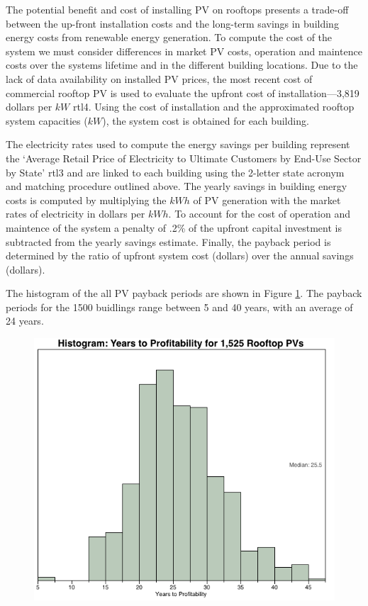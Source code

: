 The potential benefit and cost of installing PV on rooftops presents a trade-off between the up-front installation costs and the long-term savings in building energy costs from renewable energy generation. To compute the cost of the system we must consider differences in market PV costs, operation and maintence costs over the systems lifetime and in the different building locations. Due to the lack of data availability on installed PV prices, the most recent cost of commercial rooftop PV is used to evaluate the upfront cost of installation---3,819 dollars per $kW$ \cite{roisin}{rtl4}. Using the cost of installation and the approximated rooftop system capacities ($kW$), the system cost is obtained for each building. 
\par
The electricity rates used to compute the energy savings per building represent the `Average Retail Price of Electricity to Ultimate Customers by End-Use Sector by State' \cite{roisin}{rtl3} and are linked to each building using the 2-letter state acronym and matching procedure outlined above. The yearly savings in building energy costs is computed by multiplying the $kWh$ of PV generation with the market rates of electricity in dollars per $kWh$. To account for the cost of operation and maintence of the system a penalty of .2\% of the upfront capital investment is subtracted from the yearly savings estimate. Finally, the payback period is determined by the ratio of upfront system cost (dollars) over the annual savings (dollars). 
\par
The histogram of the all PV payback periods are shown in Figure \ref{fig:rtl_pic4}. The payback periods for the 1500 buidlings range between 5 and 40 years, with an average of 24 years.
\begin{figure}
  \centering
    \includegraphics[scale=0.5]{pics/rtl_pic4}
  \label{fig:rtl_pic4}
\end{figure}
